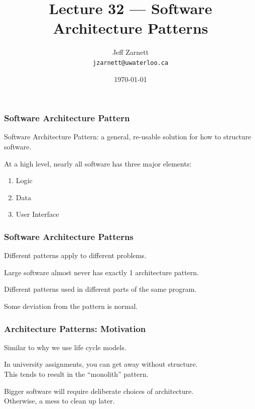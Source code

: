 

\title{Lecture 32 --- Software Architecture Patterns}

\author{Jeff Zarnett \\ \small \texttt{jzarnett@uwaterloo.ca}}
\date{\today}




\begin{frame}
  \titlepage
\end{frame}

\begin{frame}
\frametitle{Software Architecture Pattern}

\begin{changemargin}{1cm}
Software Architecture Pattern: a general, re-usable solution for how to structure software.

At a high level, nearly all software has three major elements:

\begin{enumerate}
	\item Logic 
	\item Data 
	\item User Interface 
\end{enumerate}

\end{changemargin}
\end{frame}

\begin{frame}
\frametitle{Software Architecture Patterns}

\begin{changemargin}{1cm}
Different patterns apply to different problems.

Large software almost never has exactly 1 architecture pattern.


Different patterns used in different parts of the same program.

Some deviation from the pattern is normal.

\end{changemargin}
\end{frame}



\begin{frame}
\frametitle{Architecture Patterns: Motivation}

\begin{changemargin}{1cm}
Similar to why we use life cycle models.

In university assignments, you can get away without structure.\\
\quad This tends to result in the ``monolith'' pattern.

Bigger software will require deliberate choices of architecture.\\
\quad Otherwise, a mess to clean up later.

\end{changemargin}
\end{frame}


